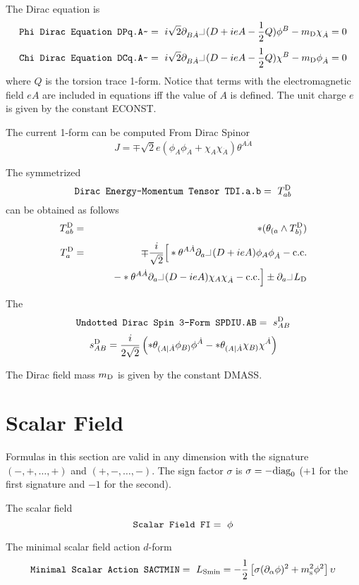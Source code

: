 \documentclass[twoside,openright]{report}
\newcommand{\grgtt}{\ttfamily}
\newcommand{\object}[2]{%
\begin{equation}
\mbox{\comm{#1}} =\ #2
\end{equation}}
\newcommand{\ipr}{\rule{1.8mm}{.1mm}\rule{.1mm}{2.2mm}\,} %
\renewcommand{\tt}{\grgtt}
\newcommand{\cc}{{\tt \char'176}}           %
\newcommand{\comm}[1]{{\upshape\tt#1}}    %
\begin{document}
The {\tt Dirac equation} is
\object{Phi Dirac Equation DPq.A\cc}{
i\sqrt2\partial_{B\dot A}\ipr(D+ieA-\frac12Q)\phi^B-m_{\rm D}\chi_{\dot A}=0}
\object{Chi Dirac Equation DCq.A\cc}{
i\sqrt2\partial_{B\dot A}\ipr(D-ieA-\frac12Q)\chi^B-m_{\rm D}\phi_{\dot A}=0}
where $Q$ is the torsion trace 1-form. Notice that terms with the
electromagnetic field $eA$ are included in equations iff
the value of $A$ is defined. The unit charge $e$ is given by the
constant \comm{ECONST}.

The current 1-form can be computed {\tt From Dirac Spinor}
\begin{equation}
J=\mp\sqrt2e(\phi_A\phi_{\dot A}+\chi_A\chi_{\dot A})\theta^{A\dot A}
\end{equation}

The symmetrized
\object{Dirac Energy-Momentum Tensor  TDI.a.b}{T^{\rm D}_{ab}}
can be obtained as follows
\begin{eqnarray}
T^{\rm D}_{ab}&=&
*(\theta_{(a}\wedge T^{\rm D}_{b)})\nonumber\\[1mm]
T^{\rm D}_a&=&\mp\frac{i}{\sqrt2}\Big[
*\theta^{A\dot A}\partial_a\ipr(D+ieA)\phi_A\phi_{\dot A}
-{\rm c.c.}\nonumber\\
&&\qquad-*\theta^{A\dot A}\partial_a\ipr(D-ieA)\chi_A\chi_{\dot A}
-{\rm c.c.}\Big]
\pm\partial_a\ipr L_{\rm D}
\end{eqnarray}

The
\object{Undotted Dirac Spin 3-Form  SPDIU.AB}{s^{\rm D}_{AB}}
\begin{equation}
s^{\rm D}_{AB}=\frac{i}{2\sqrt2}
\left(*\theta_{(A|\dot A}\phi_{B)}\phi^{\dot A}
-*\theta_{(A|\dot A}\chi_{B)}\chi^{\dot A}\right)
\end{equation}

The Dirac field mass $m_{\rm D}$ is given by the constant
\comm{DMASS}.


\section{Scalar Field}

Formulas in this section are valid in any dimension
with the signature ${\scriptstyle(-,+,\dots,+)}$ and
${\scriptstyle(+,-,\dots,-)}$.
The sign factor $\sigma$ is $\sigma=-{\rm diag}_0$
($+1$ for the first signature and $-1$ for the second).

The scalar field
\object{Scalar Field FI}{\phi}

The minimal scalar field action $d$-form
\object{Minimal Scalar Action SACTMIN}{
L_{\rm Smin}=
-\frac{1}{2}\left[\sigma(\partial_\alpha\phi)^2+
m_{\rm s}^2 \phi^2\right]\upsilon}
\end{document}
